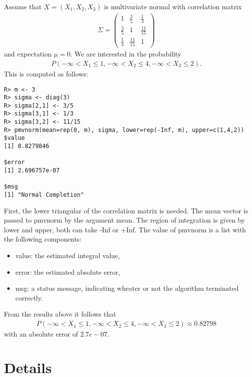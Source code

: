 \documentclass[11pt]{amsart}
\begin{document}
Assume that $ X = (X_1, X_2, X_3) $ is multivariate normal with correlation
matrix
\begin{eqnarray*}
\Sigma = \left( \begin{array}{ccc} 1 & \frac{3}{5} & \frac{1}{3} \\
\frac{3}{5} & 1 & \frac{11}{15} \\
\frac{1}{3} & \frac{11}{15} & 1 \end{array} \right)
\end{eqnarray*}
and expectation $ \mu = 0 $. We are interested in the probability 
\begin{eqnarray*}
P(-\infty < X_1 \le 1, -\infty < X_2 \le 4, -\infty < X_3 \le 2). 
\end{eqnarray*}
This is computed as follows:
\begin{verbatim}
R> m <- 3
R> sigma <- diag(3)
R> sigma[2,1] <- 3/5
R> sigma[3,1] <- 1/3
R> sigma[3,2] <- 11/15
R> pmvnorm(mean=rep(0, m), sigma, lower=rep(-Inf, m), upper=c(1,4,2))
$value
[1] 0.8279846

$error
[1] 2.696757e-07

$msg
[1] "Normal Completion"
\end{verbatim}
First, the lower triangular of the correlation matrix is needed. The mean
vector is passed to pmvnorm by the argument {\ttfamily mean}. The region of
integration is given by {\ttfamily lower} and {\ttfamily upper}, both can
take {\ttfamily -Inf} or {\ttfamily +Inf}. The value of {\ttfamily pmvnorm}
is a list with the following components:
\begin{itemize}
\item {\ttfamily value}: the estimated integral value,
\item {\ttfamily error}: the estimated absolute error,
\item {\ttfamily msg}: a status message, indicating wheater or not the algorithm
terminated correctly.
\end{itemize}
From the results above it follows that
\begin{eqnarray*}
P(-\infty < X_1 \le 1, -\infty < X_2 \le 4, -\infty < X_3 \le 2) \approx
0.82798
\end{eqnarray*}
with an absolute error of $2.7e-07$. 

\section{Details}
\end{document}

